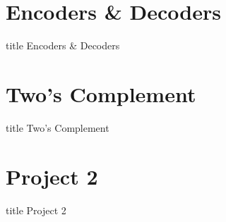 \documentclass{beamer}
\begin{document}
		
	\section{Encoders \& Decoders}
	
		\begin{frame}
         	\vfill
         	\centering
          	\begin{beamercolorbox}[sep=8pt,center,shadow=true,rounded=true]{title}
           	Encoders \& Decoders\par%
        	\end{beamercolorbox}
            \vfill
       	\end{frame}
       	
    \section{Two's Complement}
    
    	\begin{frame}
         	\vfill
         	\centering
          	\begin{beamercolorbox}[sep=8pt,center,shadow=true,rounded=true]{title}
           	Two's Complement\par%
        	\end{beamercolorbox}
            \vfill
       	\end{frame}
    
    \section{Project 2}
    
    	\begin{frame}
         	\vfill
         	\centering
          	\begin{beamercolorbox}[sep=8pt,center,shadow=true,rounded=true]{title}
           	Project 2\par%
        	\end{beamercolorbox}
            \vfill
       	\end{frame}
		
		
    
    
\end{document}
